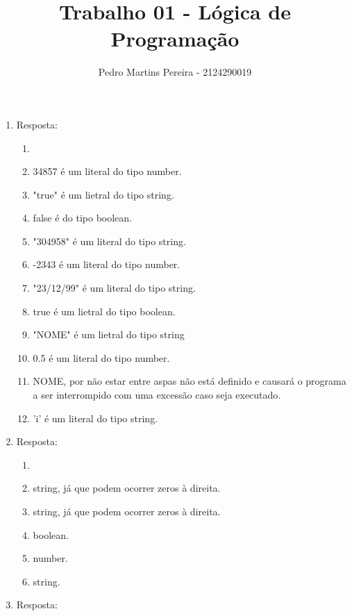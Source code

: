 \documentclass[11pt]{article}
\date{}
\begin{document}
\author{Pedro Martins Pereira - 2124290019}
\title{Trabalho 01 - Lógica de Programação}
\maketitle

\medskip

\begin{enumerate}

\item
	

	Resposta:

	\begin{enumerate}[label=(\alph*)]
		\item \addtocounter{enumii}{0}
		\item 34857 é um literal do tipo number.
		\item "true" é um lietral do tipo string.
		\item false é do tipo boolean.
		\item "304958" é um literal do tipo string.
		\item -2343 é um literal do tipo number.
		\item "23/12/99" é um literal do tipo string. 		  \item true é um lietral do tipo boolean.
		\item "NOME" é um lietral do tipo string
		\item 0.5 é um literal do tipo number.
		\item NOME, por não estar entre aspas não está definido e causará o programa a ser interrompido com uma excessão caso seja executado. 
		\item 'i' é um literal do tipo string. 
  	\end{enumerate}

\item Resposta:

	\begin{enumerate}[label=(\alph*)]
		\item \addtocounter{enumii}{0}
		\item string, já que podem ocorrer zeros à direita.
		\item string, já que podem ocorrer zeros à direita. 
		\item boolean.
		\item number.
		\item string.
  	\end{enumerate}


\item Resposta:


\end{enumerate}
\end{document}
